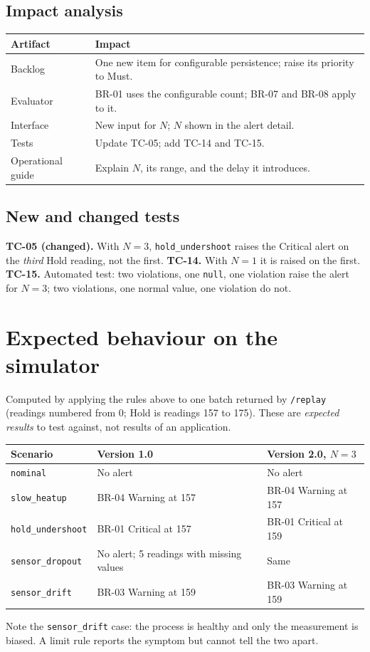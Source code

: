 \documentclass[10pt,a4paper]{article}
\newcommand{\head}[1]{\textbf{\color{courseblue}#1}}
\newcommand{\field}[1]{\texttt{#1}}
\begin{document}
\subsection{Impact analysis}
\begin{tabular}{@{}L{35mm}L{118mm}@{}}
\toprule \head{Artifact} & \head{Impact}\\ \midrule
Backlog & One new item for configurable persistence; raise its priority to Must.\\
Evaluator & BR-01 uses the configurable count; BR-07 and BR-08 apply to it.\\
Interface & New input for $N$; $N$ shown in the alert detail.\\
Tests & Update TC-05; add TC-14 and TC-15.\\
Operational guide & Explain $N$, its range, and the delay it introduces.\\
\bottomrule
\end{tabular}

\subsection{New and changed tests}
\textbf{TC-05 (changed).} With $N=3$, \field{hold\_undershoot} raises the Critical alert on the \emph{third} Hold reading, not the first. \textbf{TC-14.} With $N=1$ it is raised on the first. \textbf{TC-15.} Automated test: two violations, one \field{null}, one violation raise the alert for $N=3$; two violations, one normal value, one violation do not.

\section{Expected behaviour on the simulator}
Computed by applying the rules above to one batch returned by \field{/replay} (readings numbered from 0; Hold is readings 157 to 175). These are \emph{expected results} to test against, not results of an application.

\begin{tabular}{@{}L{35mm}L{58mm}L{58mm}@{}}
\toprule \head{Scenario} & \head{Version 1.0} & \head{Version 2.0, $N=3$}\\ \midrule
\field{nominal} & No alert & No alert\\
\field{slow\_heatup} & BR-04 Warning at 157 & BR-04 Warning at 157\\
\field{hold\_undershoot} & BR-01 Critical at 157 & BR-01 Critical at 159\\
\field{sensor\_dropout} & No alert; 5 readings with missing values & Same\\
\field{sensor\_drift} & BR-03 Warning at 159 & BR-03 Warning at 159\\
\bottomrule
\end{tabular}

\medskip
Note the \field{sensor\_drift} case: the process is healthy and only the measurement is biased. A limit rule reports the symptom but cannot tell the two apart.
\end{document}
